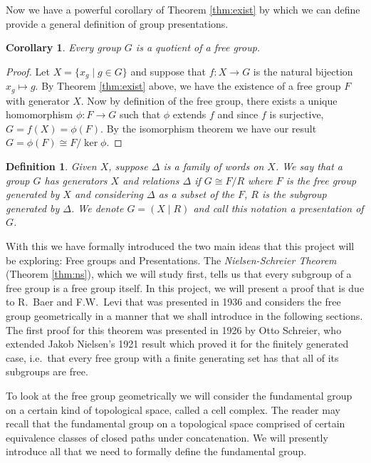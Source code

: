 \documentclass[12pt]{article}
\newtheorem{definition}{Definition}
\newtheorem{corollary}{Corollary}[theorem]
\theoremstyle{definition}
\numberwithin{equation}{theorem}
\begin{document}
Now we have a powerful corollary of Theorem \ref{thm:exist} by which we can define provide a general definition of group presentations.

\begin{corollary}
  \label{cor:presentations-exist}
Every group $G$ is a quotient of a free group.
\end{corollary}

\begin{proof}
  Let $X = \{x_g \mid g \in G \}$ and suppose that $f:X \rightarrow G$ is the natural bijection $x_g \mapsto g$. By Theorem \ref{thm:exist} above, we have the existence of a free group $F$ with generator $X$. Now by definition of the free group, there exists a unique homomorphism $\phi:F \rightarrow G$ such that $\phi$ extends $f$ and since $f$ is surjective, $G = f(X) = \phi(F)$. By the isomorphism theorem we have our result $G = \phi(F) \cong F / \ker \phi$.
\end{proof}

\begin{definition}
  Given $X$, suppose $\Delta$ is a family of words on $X$. We say that a group $G$ has \emph{generators} $X$ and \emph{relations} $\Delta$ if $G \cong F/R$ where $F$ is the free group generated by $X$ and considering $\Delta$ as a subset of the $F$, $R$ is the subgroup generated by $\Delta$. We denote $G = (X \mid R)$ and call this notation a \emph{presentation} of $G$.
\end{definition}

With this we have formally introduced the two main ideas that this project will be exploring: Free groups and Presentations. The \emph{Nielsen-Schreier Theorem} (Theorem \ref{thm:ns}), which we will study first, tells us that every subgroup of a free group is a free group itself. In this project, we will present a proof that is due to R.\ Baer and F.W.\ Levi that was presented in 1936 and considers the free group geometrically in a manner that we shall introduce in the following sections. The first proof for this theorem was presented in 1926 by Otto Schreier, who extended Jakob Nielsen's 1921 result which proved it for the finitely generated case, i.e.\ that every free group with a finite generating set has that all of its subgroups are free.

To look at the free group geometrically we will consider the fundamental group on a certain kind of topological space, called a cell complex. The reader may recall that the fundamental group on a topological space comprised of certain equivalence classes of closed paths under concatenation. We will presently introduce all that we need to formally define the fundamental group.
\end{document}

